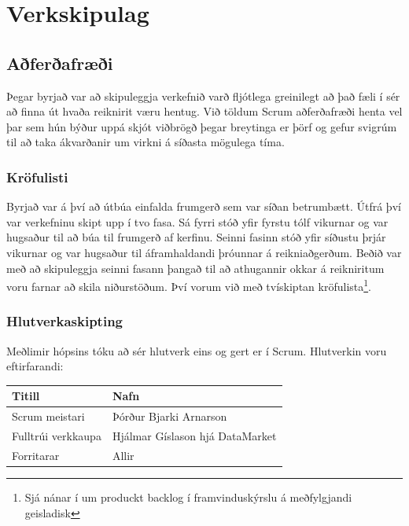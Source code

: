 \documentclass{article}
\begin{document}
\newpage

\section{Verkskipulag}


\subsection{Aðferðafræði}

Þegar byrjað var að skipuleggja verkefnið varð fljótlega greinilegt að það 
fæli í sér að finna út hvaða reiknirit væru hentug. Við töldum Scrum aðferðafræði 
henta vel þar sem hún býður uppá skjót viðbrögð þegar breytinga er þörf og 
gefur svigrúm til að taka ákvarðanir um virkni á síðasta mögulega tíma.

\subsubsection{Kröfulisti}
Byrjað var á því að útbúa einfalda frumgerð sem var síðan betrumbætt.
Útfrá því var verkefninu skipt upp í tvo fasa. 
Sá fyrri stóð yfir fyrstu tólf vikurnar og var hugsaður til að búa til frumgerð af kerfinu.
Seinni fasinn stóð yfir síðustu þrjár vikurnar og var hugsaður til áframhaldandi þróunnar á reikniaðgerðum.
Beðið var með að skipuleggja seinni fasann þangað til að athugannir okkar á reikniritum voru farnar að skila niðurstöðum. 
Því vorum við með tvískiptan kröfulista\footnote[1]{Sjá nánar í 
um produckt backlog í framvinduskýrslu á meðfylgjandi geisladisk}.

\subsubsection{Hlutverkaskipting}

Meðlimir hópsins tóku að sér hlutverk eins og gert er í Scrum. Hlutverkin voru eftirfarandi:

\vspace{5 mm}
\begin{tabular}{| l | l |}
\hline
Titill & Nafn \\
\hline \hline
Scrum meistari & Þórður Bjarki Arnarson\\
\hline
Fulltrúi verkkaupa & Hjálmar Gíslason hjá DataMarket\\
\hline
Forritarar & Allir \\
\hline
\end{tabular}
\vspace{5 mm}
\end{document}
